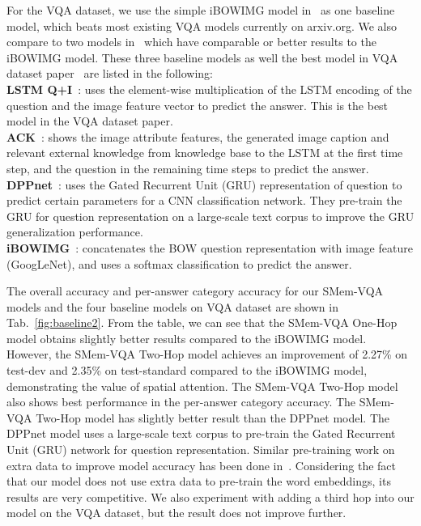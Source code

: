 For the VQA dataset, we use the simple iBOWIMG model in~\cite{zhou2015simple} as one baseline model, which beats most existing VQA models currently on arxiv.org. We also compare to two models in~\cite{wu2015ask}\cite{noh2015image} which have comparable or better results to the iBOWIMG model. These three baseline models as well the best model in VQA dataset paper~\cite{DBLP:journals/corr/AntolALMBZP15} are listed in the following:\\
{} {\bf{LSTM Q+I}}~\cite{DBLP:journals/corr/AntolALMBZP15}: uses the element-wise multiplication of the LSTM encoding of the question and the image feature vector to predict the answer. This is the best model in the VQA dataset paper.\\
{} {\bf{ACK}}~\cite{wu2015ask}: shows the image attribute features, the generated image caption and relevant external knowledge from knowledge base to the LSTM at the first time step, and the question in the remaining time steps to predict the answer.\\
{} {\bf{DPPnet}}~\cite{noh2015image}: uses the Gated Recurrent Unit (GRU) representation of question to predict certain parameters for a CNN classification network. They pre-train the GRU for question representation on a large-scale text corpus to improve the GRU generalization performance.\\
{} {\bf{iBOWIMG}}~\cite{zhou2015simple}: concatenates the BOW question representation with image feature (GoogLeNet), and uses a softmax classification to predict the answer. 

The overall accuracy and per-answer category accuracy for our SMem-VQA models and the four baseline models on VQA dataset are shown in Tab.~\ref{fig:baseline2}. From the table, we can see that the SMem-VQA One-Hop model obtains slightly better results compared to the iBOWIMG model. However, the SMem-VQA Two-Hop model achieves an improvement of 2.27\% on test-dev and 2.35\% on test-standard compared to the iBOWIMG model, demonstrating the value of spatial attention. The SMem-VQA Two-Hop model also shows best performance in the per-answer category accuracy. 
The SMem-VQA Two-Hop model has slightly better result than the DPPnet model. 
The DPPnet model uses a large-scale text corpus to pre-train the Gated Recurrent Unit (GRU) network for question representation.
Similar pre-training work on extra data to improve model accuracy has been done in~\cite{venugopalan2014translating}.
Considering the fact that our model does not use extra data to pre-train the word embeddings, its results are very competitive.
We also experiment with adding a third hop into our model on the VQA dataset, but the result does not improve further.

